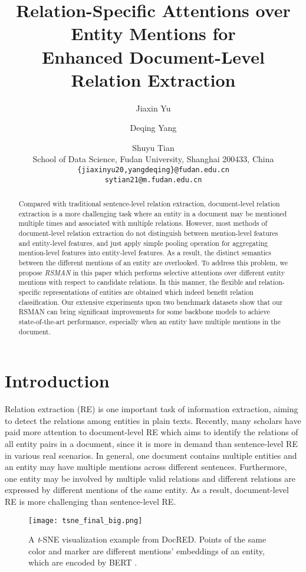 \documentclass[11pt]{article}
\title{Relation-Specific Attentions over Entity Mentions for\\ Enhanced Document-Level Relation Extraction}
\author{Jiaxin Yu \and Deqing Yang \Thanks {Corresponding author.} \and Shuyu Tian \\
        School of Data Science, Fudan University, Shanghai 200433, China \\
        \texttt{\{jiaxinyu20,yangdeqing\}@fudan.edu.cn}\\
        \texttt{sytian21@m.fudan.edu.cn}
        }
\begin{document}
\maketitle
\begin{abstract}
Compared with traditional sentence-level relation extraction, document-level relation extraction is a more challenging task where an entity in a document may be mentioned multiple times and associated with multiple relations. However, most methods of document-level relation extraction do not distinguish between mention-level features and entity-level features, and just apply simple pooling operation for aggregating mention-level features into entity-level features. As a result, the distinct semantics between the different mentions of an entity are overlooked. To address this problem, we propose \emph{RSMAN} in this paper which performs selective attentions over different entity mentions with respect to candidate relations. In this manner, the flexible and relation-specific representations of entities are obtained which indeed benefit relation classification. Our extensive experiments upon two benchmark datasets show that our RSMAN can bring significant improvements for some backbone models to achieve state-of-the-art performance, especially when an entity have multiple mentions in the document.\footnotemark[1]     

\end{abstract}


\section{Introduction}\label{intro}
Relation extraction (RE) is one important task of information extraction, aiming to detect the relations among entities in plain texts. Recently, many scholars have paid more attention to document-level RE \cite{sahu-etal-2019-inter,yao-etal-2019-docred} which aims to identify the relations of all entity pairs in a document, since it is more in demand than sentence-level RE in various real scenarios. In general, one document contains multiple entities and an entity may have multiple mentions across different sentences. Furthermore, one entity may be involved by multiple valid relations and different relations are expressed by different mentions of the same entity. As a result, document-level RE is more challenging than sentence-level RE.
\begin{figure}[t]
\centering
    \texttt{[image: tsne\_final\_big.png]}
\caption{A \emph{t}-SNE visualization example from DocRED. Points of the same color and marker are different mentions' embeddings of an entity, which are encoded by BERT \cite{devlin-etal-2019-bert}.}
    \label{fig:tsne}
\end{figure}
\end{document}

